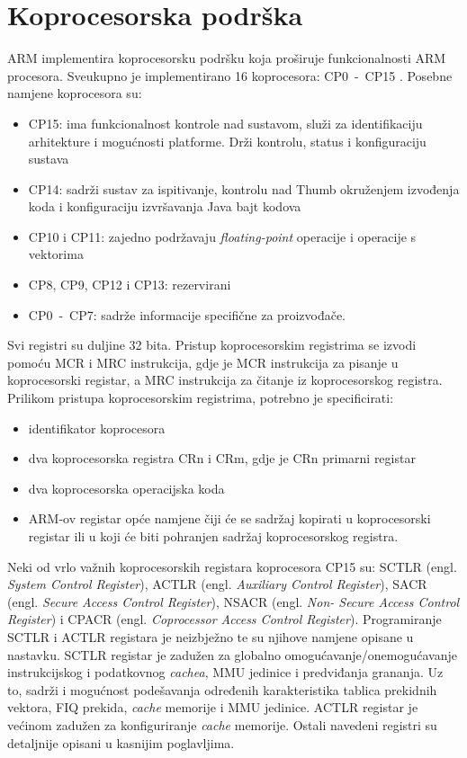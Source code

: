 \documentclass[times, utf8, diplomski, numeric]{fer}
\begin{document}
\section{Koprocesorska podrška}
ARM implementira koprocesorsku podršku koja proširuje funkcionalnosti ARM procesora. Sveukupno je implementirano 16 koprocesora:
CP0~-~CP15 \cite{arch_man}. Posebne namjene koprocesora su:
\begin{itemize}
  \item{CP15: ima funkcionalnost kontrole nad sustavom, služi za identifikaciju arhitekture i mogućnosti platforme. Drži
  kontrolu, status i konfiguraciju sustava}
  \item{CP14: sadrži sustav za ispitivanje, kontrolu nad Thumb okruženjem izvođenja koda i konfiguraciju izvršavanja Java
  bajt kodova}
  \item{CP10 i CP11: zajedno podržavaju \textit{floating-point} operacije i operacije s vektorima}
  \item{CP8, CP9, CP12 i CP13: rezervirani}
  \item{CP0~-~CP7: sadrže informacije specifične za proizvođače.}
\end{itemize}
Svi registri su duljine 32 bita. Pristup koprocesorskim registrima se izvodi pomoću MCR i MRC instrukcija, gdje je MCR
instrukcija za pisanje u koprocesorski registar, a MRC instrukcija za čitanje iz koprocesorskog registra.
Prilikom pristupa koprocesorskim registrima, potrebno je specificirati:
\begin{itemize}
  \item{identifikator koprocesora}
  \item{dva koprocesorska registra CRn i CRm, gdje je CRn primarni registar}
  \item{dva koprocesorska operacijska koda}
  \item{ARM-ov registar opće namjene čiji će se sadržaj kopirati u koprocesorski registar ili u koji će biti pohranjen
  sadržaj koprocesorskog registra.}
\end{itemize}
Neki od vrlo važnih koprocesorskih registara koprocesora CP15 su: SCTLR (engl. \textit{System Control Register}), ACTLR
(engl. \textit{Auxiliary Control Register}), SACR (engl. \textit{Secure Access Control Register}), NSACR (engl. \textit{Non-
Secure Access Control Register}) i CPACR (engl. \textit{Coprocessor Access Control Register}). Programiranje SCTLR i ACTLR
registara je neizbježno te su njihove namjene opisane u nastavku. SCTLR registar je zadužen za globalno
omogućavanje/onemogućavanje instrukcijskog i podatkovnog \textit{cachea}, MMU jedinice i predviđanja grananja. Uz to, sadrži
i mogućnost podešavanja određenih karakteristika tablica prekidnih vektora, FIQ prekida, \textit{cache} memorije i MMU jedinice.
ACTLR registar je većinom zadužen za konfiguriranje \textit{cache} memorije. Ostali navedeni registri su detaljnije opisani u
kasnijim poglavljima.
\end{document}
